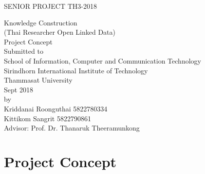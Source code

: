 \documentclass[12pt, a4paper]{report}
\begin{document}
\begin{center}

\large 
\vspace*{2cm}

SENIOR PROJECT TH3-2018\\[1cm]

\LARGE

Knowledge Construction\\(Thai Researcher Open Linked Data)\\[1cm]


Project Concept\\[2cm]
\large
Submitted to \\[1cm]
School of Information, Computer and Communication Technology \\
Sirindhorn International Institute of Technology \\
Thammasat University \\[2cm]
Sept 2018 \\[3cm]
by \\[1cm]
Kriddanai Roonguthai 5822780334\\
Kittikom Sangrit 5822790861\\[2cm]
Advisor: Prof. Dr. Thanaruk Theeramunkong	
\end{center}


\newpage
\pagestyle{plain}
\onehalfspace


\chapter{Project Concept}













%

		
\end{document}
